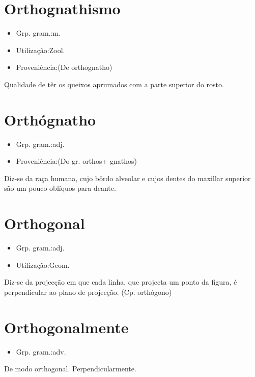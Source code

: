 \section{Orthognathismo}
\begin{itemize}
\item {Grp. gram.:m.}
\end{itemize}
\begin{itemize}
\item {Utilização:Zool.}
\end{itemize}
\begin{itemize}
\item {Proveniência:(De \textunderscore orthognatho\textunderscore )}
\end{itemize}
Qualidade de têr os queixos aprumados com a parte superior do rosto.
\section{Orthógnatho}
\begin{itemize}
\item {Grp. gram.:adj.}
\end{itemize}
\begin{itemize}
\item {Proveniência:(Do gr. \textunderscore orthos\textunderscore  + \textunderscore gnathos\textunderscore )}
\end{itemize}
Diz-se da raça humana, cujo bôrdo alveolar e cujos dentes do maxillar superior são um pouco oblíquos para deante.
\section{Orthogonal}
\begin{itemize}
\item {Grp. gram.:adj.}
\end{itemize}
\begin{itemize}
\item {Utilização:Geom.}
\end{itemize}
Diz-se da projecção em que cada linha, que projecta um ponto da figura, é perpendicular ao plano de projecção.
(Cp. \textunderscore orthógono\textunderscore )
\section{Orthogonalmente}
\begin{itemize}
\item {Grp. gram.:adv.}
\end{itemize}
De modo orthogonal.
Perpendicularmente.
